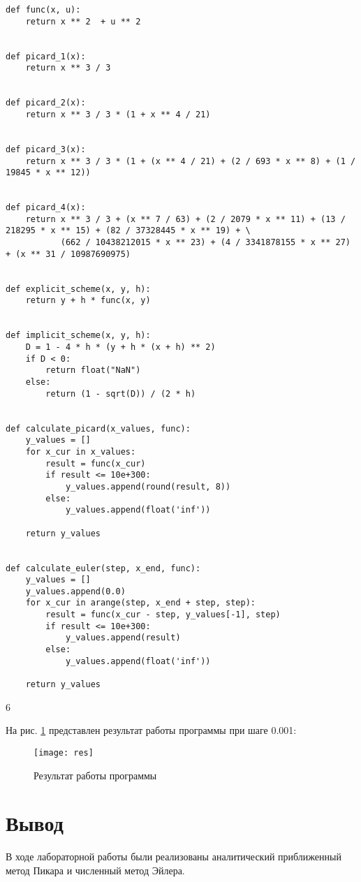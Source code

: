\documentclass[a4paper, 14pt]{article}
\begin{document}
	\begin{lstlisting}[label=some-code,caption=Реализации трех методов решения дифференциального уравнения]
def func(x, u):
    return x ** 2  + u ** 2


def picard_1(x):
    return x ** 3 / 3


def picard_2(x):
    return x ** 3 / 3 * (1 + x ** 4 / 21)


def picard_3(x):
    return x ** 3 / 3 * (1 + (x ** 4 / 21) + (2 / 693 * x ** 8) + (1 / 19845 * x ** 12))


def picard_4(x):
    return x ** 3 / 3 + (x ** 7 / 63) + (2 / 2079 * x ** 11) + (13 / 218295 * x ** 15) + (82 / 37328445 * x ** 19) + \
           (662 / 10438212015 * x ** 23) + (4 / 3341878155 * x ** 27) + (x ** 31 / 10987690975)


def explicit_scheme(x, y, h):
    return y + h * func(x, y)


def implicit_scheme(x, y, h):
    D = 1 - 4 * h * (y + h * (x + h) ** 2)
    if D < 0:
        return float("NaN")
    else:
        return (1 - sqrt(D)) / (2 * h)


def calculate_picard(x_values, func):
    y_values = []
    for x_cur in x_values:
        result = func(x_cur)
        if result <= 10e+300:
            y_values.append(round(result, 8))
        else:
            y_values.append(float('inf'))

    return y_values


def calculate_euler(step, x_end, func):
    y_values = []
    y_values.append(0.0)
    for x_cur in arange(step, x_end + step, step):
        result = func(x_cur - step, y_values[-1], step)
        if result <= 10e+300:
            y_values.append(result)
        else:
            y_values.append(float('inf'))

    return y_values
\end{lstlisting}6

\newpage
На рис. \ref{fig:res} представлен результат работы программы при шаге 0.001:
	
	\begin{figure}[H]
        	\begin{center}
        		\texttt{[image: res]}
        		\caption{Результат работы программы}
        		\label{fig:res}
        	\end{center}
        \end{figure}

\section*{Вывод}

В ходе лабораторной работы были реализованы аналитический приближенный метод Пикара и численный метод Эйлера.
\end{document}

